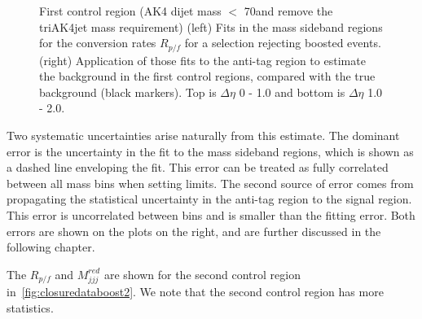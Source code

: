 \begin{figure}[h]
\caption{First control region (AK4 dijet mass $<$ 70\GeV and remove the triAK4jet mass requirement) (left) Fits in the mass sideband regions for the conversion rates $R_{p/f}$ for a selection rejecting boosted events.(right) Application of those fits to the anti-tag region to estimate the background in the first control regions, compared with the true background (black markers). Top is $\Delta\eta$ 0 - 1.0 and bottom is $\Delta\eta$ 1.0 - 2.0.}
\label{fig:closuredataboost}
\end{figure}

Two systematic uncertainties arise naturally from this estimate. The dominant error is the uncertainty in the fit to the mass sideband regions, which is shown as a dashed line enveloping the fit. This error can be treated as fully correlated between all mass bins when setting limits. The second source of error comes from propagating the statistical uncertainty in the anti-tag region to the signal region. This error is uncorrelated between bins and is smaller than the fitting error. Both errors are shown on the plots on the right, and are further discussed in the following chapter.

The $R_{p/f}$ and $M_{jjj}^{red}$ are shown for the second control region in~\ref{fig:closuredataboost2}. We note that the second control region has more statistics.


